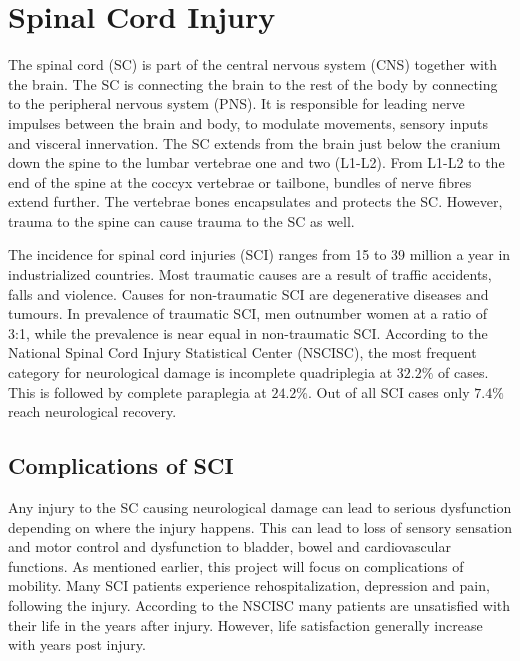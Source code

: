 
\section{Spinal Cord Injury}

The spinal cord (SC) is part of the central nervous system (CNS) together with the brain. The SC is connecting the brain to the rest of the body by connecting to the peripheral nervous system (PNS). It is responsible for leading nerve impulses between the brain and body, to modulate movements, sensory inputs and visceral innervation. The SC extends from the brain just below the cranium down the spine to the lumbar vertebrae one and two (L1-L2). From L1-L2 to the end of the spine at the coccyx vertebrae or tailbone, bundles of nerve fibres extend further. The vertebrae bones encapsulates and protects the SC. However, trauma to the spine can cause trauma to the SC as well. \cite{Weidner2017}

The incidence for spinal cord injuries (SCI) ranges from 15 to 39 million a year in industrialized countries. Most traumatic causes are a result of traffic accidents, falls and violence. Causes for non-traumatic SCI are degenerative diseases and tumours. In prevalence of traumatic SCI, men outnumber women at a ratio of 3:1, while the prevalence is near equal in non-traumatic SCI. According to the National Spinal Cord Injury Statistical Center (NSCISC), the most frequent category for neurological damage is incomplete quadriplegia at $32.2\%$ of cases. This is followed by complete paraplegia at $24.2\%$. Out of all SCI cases only $7.4\%$ reach neurological recovery. \cite{NSCISC2017} %

\subsection{Complications of SCI}
Any injury to the SC causing neurological damage can lead to serious dysfunction depending on where the injury happens. This can lead to loss of sensory sensation and motor control and dysfunction to bladder, bowel and cardiovascular functions. \cite{Weidner2017} As mentioned earlier, this project will focus on complications of mobility.
Many SCI patients experience rehospitalization, depression and pain, following the injury. According to the NSCISC many patients are unsatisfied with their life in the years after injury. However, life satisfaction generally increase with years post injury. \cite{NSCISC2017} 